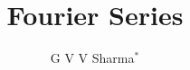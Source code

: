 \documentclass[journal,12pt,twocolumn]{IEEEtran}
\begin{document}
\let\StandardTheFigure\thefigure
\renewcommand{\thefigure}{\theproblem}



\def\putbox#1#2#3{\makebox[0in][l]{\makebox[#1][l]{}\raisebox{\baselineskip}[0in][0in]{\raisebox{#2}[0in][0in]{#3}}}}
     \def\rightbox#1{\makebox[0in][r]{#1}}
     \def\centbox#1{\makebox[0in]{#1}}
     \def\topbox#1{\raisebox{-\baselineskip}[0in][0in]{#1}}
     \def\midbox#1{\raisebox{-0.5\baselineskip}[0in][0in]{#1}}

\vspace{3cm}

\title{ 
Fourier Series
}


%
%
%

\author{ G V V Sharma$^{*}$} %
% 
%
\end{document}
